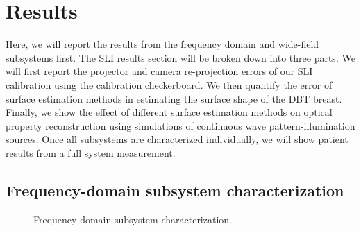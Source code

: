 \section{Results}
\label{chap:omci:results}
Here, we will report the results from the frequency domain and wide-field subsystems first. The SLI results section will be broken down into three parts. We will first report the projector and camera re-projection errors of our SLI calibration using the calibration checkerboard. We then quantify the error of surface estimation methods in estimating the surface shape of the DBT breast. Finally, we show the effect of different surface estimation methods on optical property reconstruction using simulations of continuous wave pattern-illumination sources. Once all subsystems are characterized individually, we will show patient results from a full system measurement.


\subsection{Frequency-domain subsystem characterization}
\begin{figure}[]
    \begin{center}
    \end{center}
    \caption{Frequency domain subsystem characterization.} 
    \label{fig:RFSystem}
\end{figure} 

